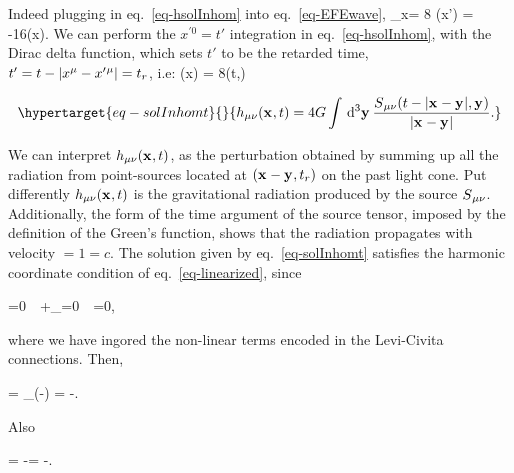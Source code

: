 \documentclass[
  11pt,
  a4paper,
  DIV=11,
  numbers=noendperiod,
  twoside]{scrreprt}
\let\[\relax \let\]\relax %
\DeclareRobustCommand{\[}{\begin{equation}}
\DeclareRobustCommand{\]}{\end{equation}}
\begin{document}

Indeed plugging in eq.~\ref{eq-hsolInhom} into eq.~\ref{eq-EFEwave}, \[
    \Box_x\weakmet = 8\grav\int{} \srcco(x') = -16\pi \grav\srcco(x).
\] We can perform the \(x^{\prime0}=t'\) integration in
eq.~\ref{eq-hsolInhom}, with the Dirac delta function, which sets \(t'\)
to be the retarded time, \(t'=t-\vert x{}^{\mu}-x'{}^{\mu} \vert= t_r\), i.e: \[
\weakmet(x) = 8\grav\int{}\srcco(t,) 
\]

\begin{equation}\protect\hypertarget{eq-solInhomt}{}{
\weakmet(\tv{x},t) = 4\grav\int\dd[3]{\tv{y}}\frac{\srcco(t-\abs{\tv{x}-\tv{y}},\tv{y})}{\abs{\tv{x}-\tv{y}}}.
}\label{eq-solInhomt}\end{equation}

We can interpret \(h{}_{\mu\nu}(\mathbf{{x}}_{},t)\), as the perturbation obtained by
summing up all the radiation from point-sources located at
\((\mathbf{{x}}_{}-\mathbf{{y}}_{},t_r)\) on the past light cone. Put differently
\(h{}_{\mu\nu}(\mathbf{{x}}_{},t)\) is the gravitational radiation produced by the
source \(S{}_{\mu\nu}\). Additionally, the form of the time argument of the
source tensor, imposed by the definition of the Green's function, shows
that the radiation propagates with velocity \(=1=c\). The solution given
by eq.~\ref{eq-solInhomt} satisfies the harmonic coordinate condition of
eq.~\ref{eq-linearized}, since

\[
    \covd{\SEco}{\mu}=0\ \Rightarrow\ \ipdv{\SEco}{\mu}+\underbracket{\Gamma\,\Gamma\,}_{}=0\ \Rightarrow\ \ipdv{\SEco}{\mu}=0,
\]

where we have ingored the non-linear terms encoded in the Levi-Civita
connections. Then,

\[
    \ipdv{\srcct}{\mu} = \partial_\mu\left(\SEco-\trSE\right) = -\ipdv{\trSE}{\mu}.
\]

Also

\[
    \trsrc[\mu] = \trSE[\mu] -\trSE = -\trSE.
\]
\end{document}
